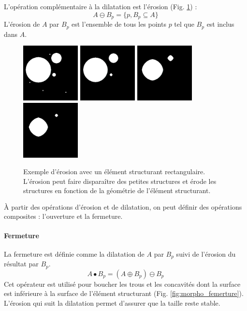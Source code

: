 L'opération complémentaire à la dilatation est l'érosion (Fig. \ref{fig:morpho_erosion}) :
\begin{equation}
  A \ominus B_p = \{p, B_p \subseteq A\}
\end{equation}
L'érosion de $A$ par $B_p$ est l'ensemble de tous les points $p$ tel que $B_p$ est inclus dans $A$. 

\begin{figure}[h]
  \centering
  \includegraphics[height=3cm]{Images/morpho_init.png}
  \includegraphics[height=3cm]{Images/morpho_erode_k5.png}
  \includegraphics[height=3cm]{Images/morpho_erode_k21.png}
  \includegraphics[height=3cm]{Images/morpho_erode_k31.png}
  \caption{Exemple d'érosion avec un élément structurant rectangulaire. L'érosion peut faire disparaître des petites structures et érode les structures en fonction de la géométrie de l'élément structurant.}
  \label{fig:morpho_erosion}
\end{figure}

À partir des opérations d'érosion et de dilatation, on peut définir des opérations composites : l'ouverture et la fermeture.
\paragraph{Fermeture}
La fermeture est définie comme la dilatation de $A$ par $B_p$ suivi de l'érosion du résultat par $B_p$.
\begin{equation}
 A \bullet B_p = (A \oplus B_p) \ominus B_p
\end{equation}  
Cet opérateur est utilisé pour boucher les trous et les concavités dont la surface est inférieure à la surface de l'élément structurant (Fig. \ref{fig:morpho_femerture}). L'érosion qui suit la dilatation permet d'assurer que la taille reste stable.

